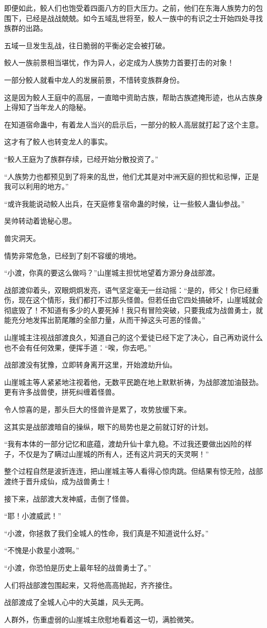 \begin{this_body}
即便如此，鲛人们也饱受着四面八方的巨大压力。之前，他们在东海人族势力的包围下，已经是战战兢兢。如今五域乱世将至，鲛人一族中的有识之士开始四处寻找族群的出路。

五域一旦发生乱战，往日脆弱的平衡必定会被打破。

鲛人一族前景相当堪忧，作为异人，必定成为人族势力首要打击的对象！

一部分鲛人就看中龙人的发展前景，不惜转变族群身份。

这是因为鲛人王庭中的高层，一直暗中资助古族，帮助古族遮掩形迹，也从古族身上得知了当年龙人的隐秘。

在知道宿命蛊中，有着龙人当兴的启示后，一部分的鲛人高层就打起了这个主意。

这才有了鲛人也转变龙人的事实。

“鲛人王庭为了族群存续，已经开始分散投资了。”

“人族势力也都预见到了将来的乱世，他们尤其是对中洲天庭的担忧和忌惮，正是我可以利用的地方。”

“或许我能说动鲛人出兵，在天庭修复宿命蛊的时候，让一些鲛人蛊仙参战。”

吴帅转动着诡秘心思。

兽灾洞天。

情势非常危急，已经到了刻不容缓的境地。

“小渡，你真的要这么做吗？”山崖城主担忧地望着方源分身战部渡。

战部渡仰着头，双眼炯炯发亮，语气坚定毫无一丝动摇：“是的，师父！你已经重伤，现在这个情形，我们都打不过那头怪兽。但若任由它四处搞破坏，山崖城就会彻底毁了！不知道有多少的人要死掉！我只有冒险突破，只要我成为战兽勇士，就能充分地发挥出箭尾雕的全部力量，从而干掉这头可恶的怪兽。”

山崖城主注视战部渡良久，知道自己的这个爱徒已经下定了决心，自己再劝说什么也不会有任何效果，便挥手道：“唉，你去吧。”

战部渡没有犹豫，立即转身离开这里，开始渡劫升仙。

山崖城主等人紧紧地注视着他，无数平民跪在地上默默祈祷，为战部渡加油鼓劲。更有许多战兽使，拼死纠缠着怪兽。

令人惊喜的是，那头巨大的怪兽许是累了，攻势放缓下来。

这其实是战部渡暗自的操纵，眼下的局势也是之前就订好的计划。

“我有本体的一部分记忆和底蕴，渡劫升仙十拿九稳。不过我还要做出凶险的样子，不仅是为了瞒过山崖城的所有人，还有这片洞天的天灵啊！”

整个过程自然是波折连连，把山崖城主等人看得心惊肉跳。但结果有惊无险，战部渡终于晋升成仙，成为战兽勇士！

接下来，战部渡大发神威，击倒了怪兽。

“耶！小渡威武！”

“小渡，你拯救了我们全城人的性命，我们真是不知道说什么好。”

“不愧是小救星小渡啊。”

“小渡，你恐怕是历史上最年轻的战兽勇士了。”

人们将战部渡包围起来，又将他高高抛起，齐齐接住。

战部渡成了全城人心中的大英雄，风头无两。

人群外，伤重虚弱的山崖城主欣慰地看着这一切，满脸微笑。

\end{this_body}

